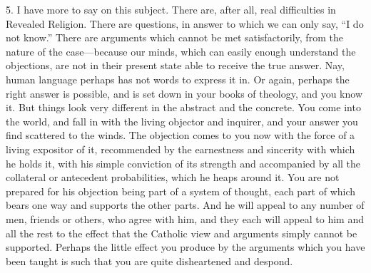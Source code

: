 5. I have more to say on this subject. There are,
after all, real difficulties in Revealed Religion. There are
questions, in answer to which we can only say, ``I do not know.''
There are arguments which cannot be met satisfactorily, from the
nature of the case—because our minds, which can easily enough
understand the objections, are not in their present state able to
receive the true answer. Nay, human language perhaps has not words to
express it in. Or again, perhaps the right answer is possible, and is
set down in your books of theology, and you know it. But things look
very different in the abstract and the concrete. You come into the
world, and fall in with the living objector and inquirer, and your
answer you find scattered to the winds. The objection comes to you now
with the force of a living expositor of it, recommended by the
earnestness and sincerity with which he holds it, with his simple
conviction of its strength and accompanied by all the collateral or
antecedent probabilities, which he heaps around it. You are not
prepared for his objection being part of a system of thought, each
part of which bears one way and supports the other parts. And he will
appeal to any number of men, friends or others, who agree with him,
and they each will appeal to him and all the rest to the effect that
the Catholic view and arguments simply cannot be supported. Perhaps
the little effect you produce by the arguments which you have been
taught is such that you are quite disheartened and despond.

